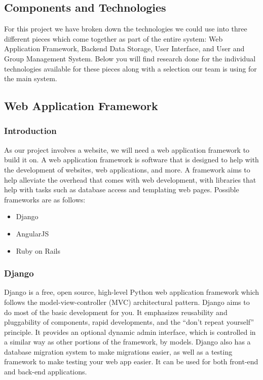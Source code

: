 \documentclass[draftclsnofoot,10pt,onecolumn]{IEEEtran} %
\begin{document}
\subsection{Components and Technologies}
For this project we have broken down the technologies we could use into three different pieces which come together as part
of the entire system: Web Application Framework, Backend Data Storage, User Interface, and User and Group Management
System. Below you will find research done for the individual technologies available for these pieces along with a selection
our team is using for the main system. \\

\subsection{Web Application Framework}

\subsubsection{Introduction}
As our project involves a website, we will need a web application framework to build it on. A web application framework is
software that is designed to help with the development of websites, web applications, and more. A framework aims to help
alleviate the overhead that comes with web development, with libraries that help with tasks such as database access and
templating web pages. Possible frameworks are as follows:

	\begin{itemize}
		\item Django
		\item AngularJS
		\item Ruby on Rails \\
	\end{itemize}
	
\subsubsection{Django}
Django is a free, open source, high-level Python web application framework which follows the model-view-controller
(MVC) architectural pattern. Django aims to do most of the basic development for you. It emphasizes reusability and
pluggability of components, rapid developments, and the “don’t repeat yourself” principle. It provides an optional dynamic
admin interface, which is controlled in a similar way as other portions of the framework, by models. Django also has a
database migration system to make migrations easier, as well as a testing framework to make testing your web app easier. It
can be used for both front-end and back-end applications.\\
\end{document}
